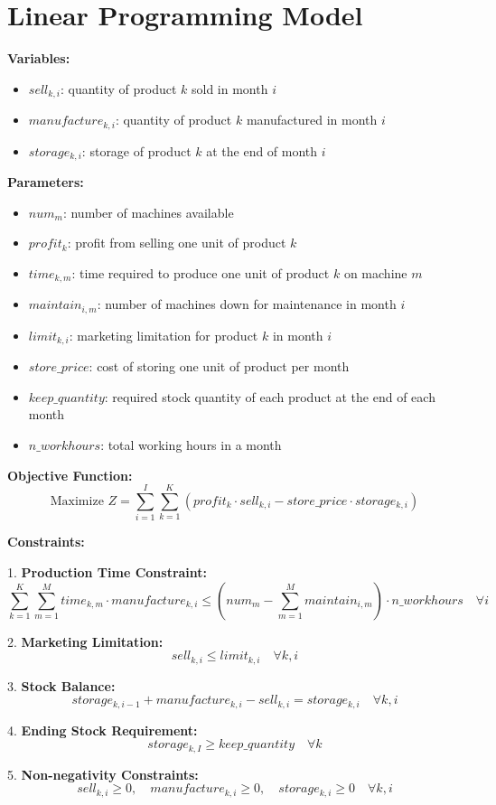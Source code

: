 \documentclass{article}
\begin{document}
\section*{Linear Programming Model}

\textbf{Variables:}
\begin{itemize}
    \item \( sell_{k, i} \): quantity of product \( k \) sold in month \( i \)
    \item \( manufacture_{k, i} \): quantity of product \( k \) manufactured in month \( i \)
    \item \( storage_{k, i} \): storage of product \( k \) at the end of month \( i \)
\end{itemize}

\textbf{Parameters:}
\begin{itemize}
    \item \( num_m \): number of machines available
    \item \( profit_k \): profit from selling one unit of product \( k \)
    \item \( time_{k, m} \): time required to produce one unit of product \( k \) on machine \( m \)
    \item \( maintain_{i, m} \): number of machines down for maintenance in month \( i \)
    \item \( limit_{k, i} \): marketing limitation for product \( k \) in month \( i \)
    \item \( store\_price \): cost of storing one unit of product per month
    \item \( keep\_quantity \): required stock quantity of each product at the end of each month
    \item \( n\_workhours \): total working hours in a month
\end{itemize}

\textbf{Objective Function:}
\[
\text{Maximize } Z = \sum_{i=1}^{I} \sum_{k=1}^{K} \left( profit_k \cdot sell_{k, i} - store\_price \cdot storage_{k, i} \right)
\]

\textbf{Constraints:}

1. \textbf{Production Time Constraint:}
\[
\sum_{k=1}^{K} \sum_{m=1}^{M} time_{k, m} \cdot manufacture_{k, i} \leq \left( num_m - \sum_{m=1}^{M} maintain_{i, m} \right) \cdot n\_workhours \quad \forall i
\]

2. \textbf{Marketing Limitation:}
\[
sell_{k, i} \leq limit_{k, i} \quad \forall k, i
\]

3. \textbf{Stock Balance:}
\[
storage_{k, i-1} + manufacture_{k, i} - sell_{k, i} = storage_{k, i} \quad \forall k, i
\]

4. \textbf{Ending Stock Requirement:}
\[
storage_{k, I} \geq keep\_quantity \quad \forall k
\]

5. \textbf{Non-negativity Constraints:}
\[
sell_{k, i} \geq 0, \quad manufacture_{k, i} \geq 0, \quad storage_{k, i} \geq 0 \quad \forall k, i
\]
\end{document}
